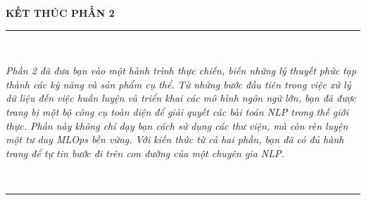 \documentclass[11pt, a4paper, twoside]{book}
\begin{document}
% 
% 
% 
% 
% 
% 

% 
% 
% 
% 
% 

% 
% 
% 
% 
% 
% 

% 
% 
% 
% 
% 
% 
% 


\clearpage
\thispagestyle{empty}

\begin{center}
    \vspace*{4cm}
    {\Huge \textbf{KẾT THÚC PHẦN 2}} \\[1.5cm]

    \rule{0.8\textwidth}{0.4pt} \\[0.8cm]

    \parbox{0.9\textwidth}{
        \centering
        \textit{
        Phần 2 đã đưa bạn vào một hành trình thực chiến, biến những lý thuyết phức tạp 
        thành các kỹ năng và sản phẩm cụ thể. Từ những bước đầu tiên trong việc 
        xử lý dữ liệu đến việc huấn luyện và triển khai các mô hình ngôn ngữ lớn, 
        bạn đã được trang bị một bộ công cụ toàn diện để giải quyết các bài toán 
        NLP trong thế giới thực. Phần này không chỉ dạy bạn cách sử dụng các thư viện, 
        mà còn rèn luyện một tư duy MLOps bền vững. Với kiến thức từ cả hai phần, 
        bạn đã có đủ hành trang để tự tin bước đi trên con đường của một chuyên gia NLP.
        }
    } \\[1cm]

    \rule{0.8\textwidth}{0.4pt} \\[2cm]
\end{center}
\end{document}

